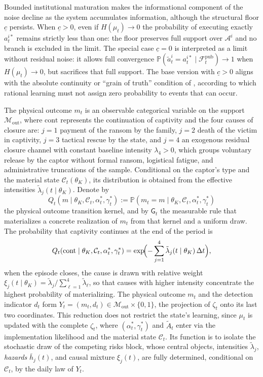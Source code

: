 \documentclass[ecta,nameyear,draft]{econsocart}
\theoremstyle{plain}
\theoremstyle{definition}
\newcommand{\Prob}{\mathbb{P}}
\newcommand{\1}{\mathbf{1}}
\begin{document}
Bounded institutional maturation makes the informational component of the noise decline as the system accumulates information, although the structural floor $\underline{c}$ persists. When $\underline{c}>0$, even if $H(\mu_t)\to 0$ the probability of executing exactly $a_t^{i\ast}$ remains strictly less than one: the floor preserves full support over $\mathcal{A}^i$ and no branch is excluded in the limit. The special case $\underline{c}=0$ is interpreted as a limit without residual noise: it allows full convergence $\Prob(\tilde{a}_t^i=a_t^{i\ast}\mid\mathcal{F}_t^{\mathrm{pub}})\to 1$ when $H(\mu_t)\to 0$, but sacrifices that full support. The base version with $\underline{c}>0$ aligns with the absolute continuity or ``grain of truth'' condition of \citet{KalaiLehrer1993}, according to which rational learning must not assign zero probability to events that can occur.

The physical outcome $m_t$ is an observable categorical variable on the support $\mathcal{M}_{\mathrm{out}}$, where $\mathrm{cont}$ represents the continuation of captivity and the four causes of closure are: $j=1$ payment of the ransom by the family, $j=2$ death of the victim in captivity, $j=3$ tactical rescue by the state, and $j=4$ an exogenous residual closure channel with constant baseline intensity $\lambda_4>0$, which groups voluntary release by the captor without formal ransom, logistical fatigue, and administrative truncations of the sample. Conditional on the captor's type and the material state $\mathcal{C}_t(\theta_K)$, its distribution is obtained from the effective intensities $\tilde{\lambda}_j(t\mid\theta_K)$. Denote by
\[
Q_t(m\mid\theta_K,\mathcal{C}_t,\alpha_t^\ast,\gamma_t^\ast)
:=\Prob(m_t=m\mid\theta_K,\mathcal{C}_t,\alpha_t^\ast,\gamma_t^\ast)
\]
the physical outcome transition kernel, and by $\mathsf{G}_t$ the measurable rule that materializes a concrete realization of $m_t$ from that kernel and a uniform draw. The probability that captivity continues at the end of the period is
\[
Q_t(\mathrm{cont}\mid\theta_K,\mathcal{C}_t,\alpha_t^\ast,\gamma_t^\ast)=\exp\!\Bigl(-\sum_{j=1}^{4}\tilde{\lambda}_j(t\mid\theta_K)\,\Delta t\Bigr),
\]
when the episode closes, the cause is drawn with relative weight $\xi_j(t\mid\theta_K)=\tilde{\lambda}_j/\sum_{\ell=1}^{4}\tilde{\lambda}_\ell$, so that causes with higher intensity concentrate the highest probability of materializing. The physical outcome $m_t$ and the detection indicator $d_t$ form $Y_t=(m_t,d_t)\in\mathcal{M}_{\mathrm{out}}\times\{0,1\}$, the projection of $\zeta_t$ onto its last two coordinates. This reduction does not restrict the state's learning, since $\mu_t$ is updated with the complete $\zeta_t$, where $(\alpha_t^\ast,\gamma_t^\ast)$ and $\tilde{A}_t$ enter via the implementation likelihood and the material state $\mathcal{C}_t$. Its function is to isolate the stochastic draw of the competing risks block, whose central objects, intensities $\tilde{\lambda}_j$, \textit{hazards} $\bar{h}_j(t)$, and causal mixture $\xi_j(t)$, are fully determined, conditional on $\mathcal{C}_t$, by the daily law of $Y_t$.
\end{document}
